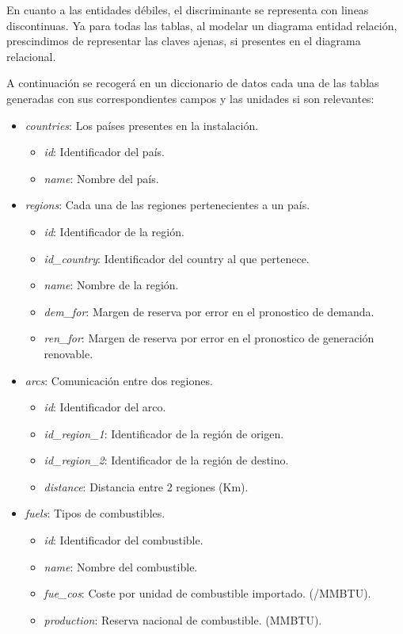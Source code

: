 En cuanto a las entidades débiles, el discriminante se representa con lineas discontinuas. Ya para todas las tablas, al modelar un diagrama entidad relación, prescindimos de representar las claves ajenas, si presentes en el diagrama relacional.

A continuación se recogerá en un diccionario de datos cada una de las tablas generadas con sus correspondientes campos y las unidades si son relevantes:

\begin{itemize}
	
	\item \textit{countries}: Los países presentes en la instalación.
	\begin{itemize}
		\item \textit{id}: Identificador del país.		
		\item \textit{name}: Nombre del país.
	\end{itemize}
	
	\item \textit{regions}: Cada una de las regiones pertenecientes a un país.
	\begin{itemize}
		\item \textit{id}: Identificador de la región.		
		\item \textit{id\_country}: Identificador del country al que pertenece.
		\item \textit{name}: Nombre de la región.
		\item \textit{dem\_for}: Margen de reserva por error en el pronostico de demanda.
		\item \textit{ren\_for}: Margen de reserva por error en el pronostico de generación renovable.
	\end{itemize}

	\item \textit{arcs}: Comunicación entre dos regiones.
	\begin{itemize}
		\item \textit{id}: Identificador del arco.		
		\item \textit{id\_region\_1}: Identificador de la región de origen.
		\item \textit{id\_region\_2}: Identificador de la región de destino.
		\item \textit{distance}: Distancia entre 2 regiones (Km).
	\end{itemize}
	
	\item \textit{fuels}: Tipos de combustibles.
	\begin{itemize}
		\item \textit{id}: Identificador del combustible.		
		\item \textit{name}: Nombre del combustible.
		\item \textit{fue\_cos}: Coste por unidad de combustible importado. (\textdollar/MMBTU).
		\item \textit{production}: Reserva nacional de combustible. (MMBTU).
	\end{itemize}
	

\end{itemize}
